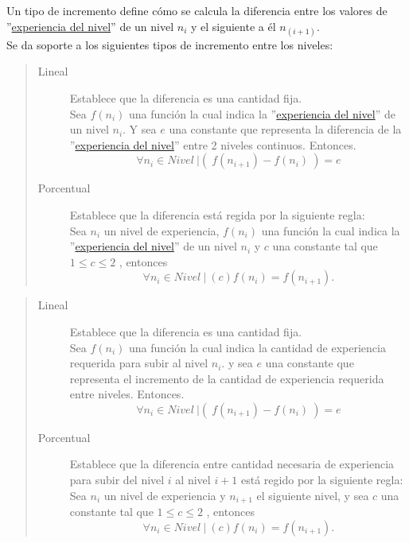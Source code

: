  Un tipo de incremento define cómo se calcula la diferencia entre los valores de
 ''\hyperref[table:METerminosExperiencia1]{experiencia del nivel}'' de un nivel
 \textit{$n_i$} y el siguiente a él \textit{$n_(i+1)$}.\\
    
 \noindent
 Se da soporte a los siguientes tipos de incremento entre los niveles:
    
    \begin{quote}
    \begin{description}
        \item[Lineal] Establece que la diferencia es una cantidad fija.\\
        Sea $f(n_i)$ una función la cual indica la ''\hyperref[table:METerminosExperiencia1]{experiencia del nivel}'' de un nivel $n_i$. Y sea $e$ una constante que representa la diferencia de la ''\hyperref[table:METerminosExperiencia1]{experiencia del nivel}'' entre 2 niveles continuos. Entonces.
            $$\forall n_i \in Nivel\ | \left(\ f(n_{i+1}) - f(n_i)\ \right) = e$$
        
        \item[Porcentual] Establece que la diferencia está regida por la siguiente regla:\\
        Sea $n_i$ un nivel de experiencia,  $f(n_i)$ una función la cual indica la ''\hyperref[table:METerminosExperiencia1]{experiencia del nivel}'' de un nivel $n_i$ y  $c$ una constante tal que $1 \leq c \leq 2$ , entonces
            $$\forall n_i \in Nivel\ |\ (c)f(n_i) = f(n_{i+1}).$$
    \end{description}
    \end{quote}
    
    
    \begin{quote}
    \begin{description}
        \item[Lineal] Establece que la diferencia es una cantidad fija.\\
        Sea $f(n_i)$ una función la cual indica la cantidad de experiencia requerida para subir al nivel $n_i$. y sea $e$ una constante que representa el incremento de la cantidad de experiencia requerida entre niveles. Entonces.
            $$\forall n_i \in Nivel\ | \left(\ f(n_{i+1}) - f(n_i)\ \right) = e$$
        
        \item[Porcentual] Establece que la diferencia entre cantidad necesaria de experiencia para subir del nivel $i$ al nivel $i+1$ está regido por la siguiente regla:\\
        Sea $n_i$ un nivel de experiencia y $n_{i+1}$ el siguiente nivel, y sea $c$ una constante tal que $1 \leq c \leq 2$ , entonces
            $$\forall n_i \in Nivel\ |\ (c)f(n_i) = f(n_{i+1}).$$
    \end{description}
    \end{quote}

